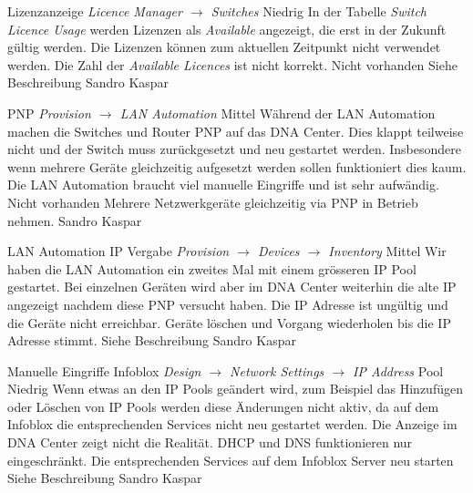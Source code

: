 \bugreport
{Lizenzanzeige}
{\textit{Licence Manager $\rightarrow$ Switches}}
{Niedrig}
{In der Tabelle \textit{Switch Licence Usage} werden Lizenzen als \textit{Available} angezeigt, die erst in der Zukunft gültig werden.}
{Die Lizenzen können zum aktuellen Zeitpunkt nicht verwendet werden. Die Zahl der \textit{Available Licences} ist nicht korrekt.}
{Nicht vorhanden}
{
	Siehe Beschreibung
}
{Sandro Kaspar}
{}


\bugreport
{PNP}
{\textit{Provision $\rightarrow$ LAN Automation}}
{Mittel}
{Während der LAN Automation machen die Switches und Router PNP auf das DNA Center. Dies klappt teilweise nicht und der Switch muss zurückgesetzt und neu gestartet werden. Insbesondere wenn mehrere Geräte gleichzeitig aufgesetzt werden sollen funktioniert dies kaum.}
{Die LAN Automation braucht viel manuelle Eingriffe und ist sehr aufwändig.}
{Nicht vorhanden}
{Mehrere Netzwerkgeräte gleichzeitig via PNP in Betrieb nehmen.}
{Sandro Kaspar}
{}


\bugreport
{LAN Automation IP Vergabe}
{\textit{Provision $\rightarrow$ Devices $\rightarrow$ Inventory}}
{Mittel}
{Wir haben die LAN Automation ein zweites Mal mit einem grösseren IP Pool gestartet. Bei einzelnen Geräten wird aber im DNA Center weiterhin die alte IP angezeigt nachdem diese PNP versucht haben.}
{Die IP Adresse ist ungültig und die Geräte nicht erreichbar.}
{Geräte löschen und Vorgang wiederholen bis die IP Adresse stimmt.}
{
	Siehe Beschreibung
}
{Sandro Kaspar}
{}

\bugreport
{Manuelle Eingriffe Infoblox}
{\textit{Design $\rightarrow$ Network Settings $\rightarrow$ IP Address} Pool}
{Niedrig}
{Wenn etwas an den IP Pools geändert wird, zum Beispiel das Hinzufügen oder Löschen von IP Pools werden diese Änderungen nicht aktiv, da auf dem Infoblox die entsprechenden Services nicht neu gestartet werden.}
{Die Anzeige im DNA Center zeigt nicht die Realität. DHCP und DNS funktionieren nur eingeschränkt.}
{Die entsprechenden Services auf dem Infoblox Server neu starten}
{
	Siehe Beschreibung
}
{Sandro Kaspar}
{}

